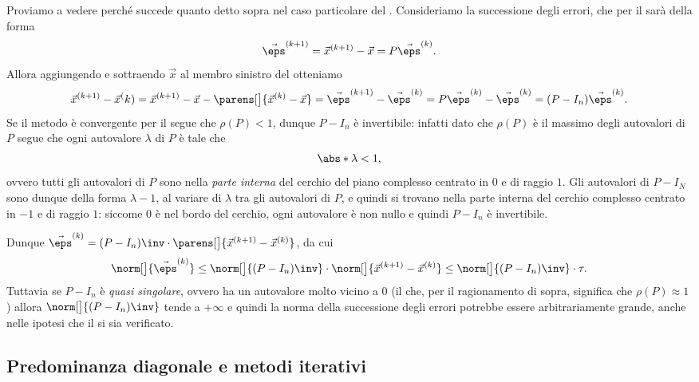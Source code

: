 \begin{example}
    Proviamo a vedere perché succede quanto detto sopra nel caso particolare del . Consideriamo la successione degli errori, che per il  sarà della forma \[
        \vec \eps^{(k+1)} = \vec x^{(k+1)} - \vec x = P\vec\eps^{(k)}.
    \] Allora aggiungendo e sottraendo $\vec x$ al membro sinistro del  otteniamo \[
        \vec x^{(k+1)} - \vec x^(k) 
        = \vec x^{(k+1)} - \vec x - \parens[\big]{\vec x^{(k)} - \vec x} 
        = \vec\eps^{(k+1)} - \vec\eps^{(k)} 
        = P\vec\eps^{(k)} - \vec\eps^{(k)} 
        = (P - I_n)\vec \eps^{(k)}.
    \] Se il metodo è convergente per il  segue che $\rho(P) < 1$, dunque $P - I_n$ è invertibile: infatti dato che $\rho(P)$ è il massimo degli autovalori di $P$ segue che ogni autovalore $\lambda$ di $P$ è tale che \[
        \abs*{\lambda} < 1,
    \] ovvero tutti gli autovalori di $P$ sono nella \emph{parte interna} del cerchio del piano complesso centrato in $0$ e di raggio $1$. Gli autovalori di $P - I_N$ sono dunque della forma $\lambda - 1$, al variare di $\lambda$ tra gli autovalori di $P$, e quindi si trovano nella parte interna del cerchio complesso centrato in $-1$ e di raggio $1$: siccome $0$ è nel bordo del cerchio, ogni autovalore è non nullo e quindi $P - I_n$ è invertibile.
    
    Dunque $\vec \eps^{(k)} = (P - I_n)\inv \cdot \parens[\big]{\vec x^{(k+1)} - \vec x^{(k)}}$, da cui \begin{align*}
        \norm[\big]{\vec \eps^{(k)}} 
        \leq \norm[\big]{(P - I_n)\inv} \cdot \norm[\big]{\vec x^{(k+1)} - \vec x^{(k)}} 
        \leq \norm[\big]{(P - I_n)\inv} \cdot \tau.
    \end{align*} Tuttavia se $P - I_n$ è \emph{quasi singolare}, ovvero ha un autovalore molto vicino a $0$ (il che, per il ragionamento di sopra, significa che $\rho(P) \approx 1$) allora $\norm[\big]{(P - I_n)\inv}$ tende a $+\infty$ e quindi la norma della successione degli errori potrebbe essere arbitrariamente grande, anche nelle ipotesi che il  si sia verificato.
\end{example}

\subsection{Predominanza diagonale e metodi iterativi}

